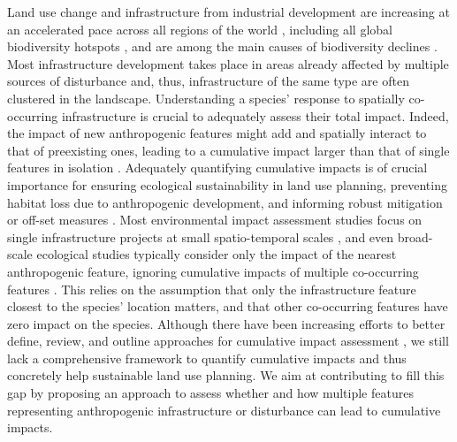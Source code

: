\documentclass[titlepage]{article}
\begin{document}
Land use change and infrastructure from industrial development are increasing at an accelerated pace across all regions of the world \citep{ibisch_global_2016,venter_sixteen_2016}, including all global biodiversity hotspots \citep{hu_overview_2021}, and are among the main causes of biodiversity declines \citep{benitez-lopez_impacts_2010,newbold_global_2015}. Most infrastructure development takes place in areas already affected by multiple sources of disturbance \citep{barber_roads_2014} and, thus, infrastructure of the same type are often clustered in the landscape. Understanding a species' response to spatially co-occurring infrastructure is crucial to adequately assess their total impact. Indeed, the impact of new anthropogenic features might add and spatially interact to that of preexisting ones, leading to a cumulative impact larger than that of 
single features in isolation \citep[Box 1; ][]{naugle_unifying_2011}.  
Adequately quantifying cumulative impacts is of crucial importance for ensuring ecological sustainability in land use planning, preventing habitat loss due to anthropogenic development, and informing robust mitigation or off-set measures \citep{gillingham_integration_2016, laurance_roads_2017}. Most environmental impact assessment studies focus on single infrastructure projects at small spatio-temporal scales \citep{johnson_regulating_2011}, and even broad-scale ecological studies typically consider only the impact of the nearest anthropogenic feature, ignoring cumulative impacts of multiple co-occurring features \citep[e.g.][]{torres_assessing_2016}. This relies on the assumption that only the infrastructure feature closest to the species' location matters, and that other co-occurring features have zero impact on the species. Although there have been increasing efforts to better define, review, and outline approaches for cumulative impact assessment \citep{gillingham_integration_2016,naugle_unifying_2011}, we still lack a comprehensive framework to quantify cumulative impacts and thus concretely help sustainable land use planning. We aim at contributing to fill this gap by proposing an approach to assess whether and how multiple features representing anthropogenic infrastructure or disturbance can lead to cumulative impacts.
\end{document}
